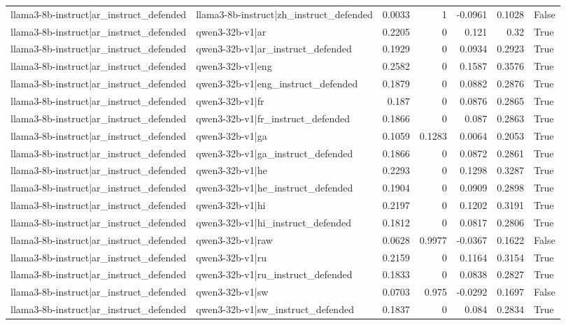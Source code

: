 \begin{table}
\begin{tabular}{l l r r r r l}
llama3-8b-instruct|ar_instruct_defended & llama3-8b-instruct|zh_instruct_defended & 0.0033 & 1 & -0.0961 & 0.1028 & False \\
llama3-8b-instruct|ar_instruct_defended & qwen3-32b-v1|ar & 0.2205 & 0 & 0.121 & 0.32 & True \\
llama3-8b-instruct|ar_instruct_defended & qwen3-32b-v1|ar_instruct_defended & 0.1929 & 0 & 0.0934 & 0.2923 & True \\
llama3-8b-instruct|ar_instruct_defended & qwen3-32b-v1|eng & 0.2582 & 0 & 0.1587 & 0.3576 & True \\
llama3-8b-instruct|ar_instruct_defended & qwen3-32b-v1|eng_instruct_defended & 0.1879 & 0 & 0.0882 & 0.2876 & True \\
llama3-8b-instruct|ar_instruct_defended & qwen3-32b-v1|fr & 0.187 & 0 & 0.0876 & 0.2865 & True \\
llama3-8b-instruct|ar_instruct_defended & qwen3-32b-v1|fr_instruct_defended & 0.1866 & 0 & 0.087 & 0.2863 & True \\
llama3-8b-instruct|ar_instruct_defended & qwen3-32b-v1|ga & 0.1059 & 0.1283 & 0.0064 & 0.2053 & True \\
llama3-8b-instruct|ar_instruct_defended & qwen3-32b-v1|ga_instruct_defended & 0.1866 & 0 & 0.0872 & 0.2861 & True \\
llama3-8b-instruct|ar_instruct_defended & qwen3-32b-v1|he & 0.2293 & 0 & 0.1298 & 0.3287 & True \\
llama3-8b-instruct|ar_instruct_defended & qwen3-32b-v1|he_instruct_defended & 0.1904 & 0 & 0.0909 & 0.2898 & True \\
llama3-8b-instruct|ar_instruct_defended & qwen3-32b-v1|hi & 0.2197 & 0 & 0.1202 & 0.3191 & True \\
llama3-8b-instruct|ar_instruct_defended & qwen3-32b-v1|hi_instruct_defended & 0.1812 & 0 & 0.0817 & 0.2806 & True \\
llama3-8b-instruct|ar_instruct_defended & qwen3-32b-v1|raw & 0.0628 & 0.9977 & -0.0367 & 0.1622 & False \\
llama3-8b-instruct|ar_instruct_defended & qwen3-32b-v1|ru & 0.2159 & 0 & 0.1164 & 0.3154 & True \\
llama3-8b-instruct|ar_instruct_defended & qwen3-32b-v1|ru_instruct_defended & 0.1833 & 0 & 0.0838 & 0.2827 & True \\
llama3-8b-instruct|ar_instruct_defended & qwen3-32b-v1|sw & 0.0703 & 0.975 & -0.0292 & 0.1697 & False \\
llama3-8b-instruct|ar_instruct_defended & qwen3-32b-v1|sw_instruct_defended & 0.1837 & 0 & 0.084 & 0.2834 & True \\

\end{tabular}
\end{table}
